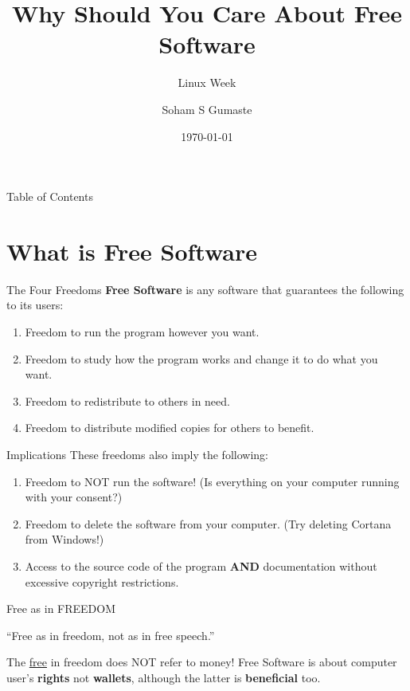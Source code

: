 \documentclass{beamer}
\title{Why Should You Care About Free Software}
\subtitle{Linux Week \the\year{}}
\author{Soham S Gumaste}
\date{\today}
\institute{Linux Users Group @ UIC}
\begin{document}
\begin{frame}
	\titlepage
\end{frame}

\begin{frame}{Table of Contents}
	\tableofcontents[pausesections]
\end{frame}

\section{What is Free Software}
\begin{frame}{The Four Freedoms}
	\textbf{Free Software} is any software that guarantees the following to
	its users:
	\pause
	\begin{enumerate}
		\item Freedom to run the program however you want.
			\pause
		\item Freedom to study how the program works and change it to
			do what you want.
			\pause
		\item Freedom to redistribute to others in need.
			\pause
		\item Freedom to distribute modified copies for others to
			benefit.
	\end{enumerate}
\end{frame}

\begin{frame}{Implications}
	These freedoms also imply the following:
	\pause
	\begin{enumerate}
		\item Freedom to NOT run the software! (Is everything on your
			computer running with your consent?)
			\pause
		\item Freedom to delete the software from your computer. (Try
			deleting Cortana from Windows!)
			\pause
		\item Access to the source code of the program \textbf{AND}
			documentation without excessive copyright restrictions.
	\end{enumerate}
\end{frame}

\begin{frame}{Free as in FREEDOM}
	\begin{block}{}
		{\large ``Free as in freedom, not as in free speech.''}
		\vskip5mm
		\hspace*{}
	\end{block}

	\pause

	The \underline{free} in freedom does NOT refer to money! Free Software
	is about computer user's \textbf{rights} not \textbf{wallets}, although
	the latter is \textbf{beneficial} too.
\end{frame}
\end{document}
